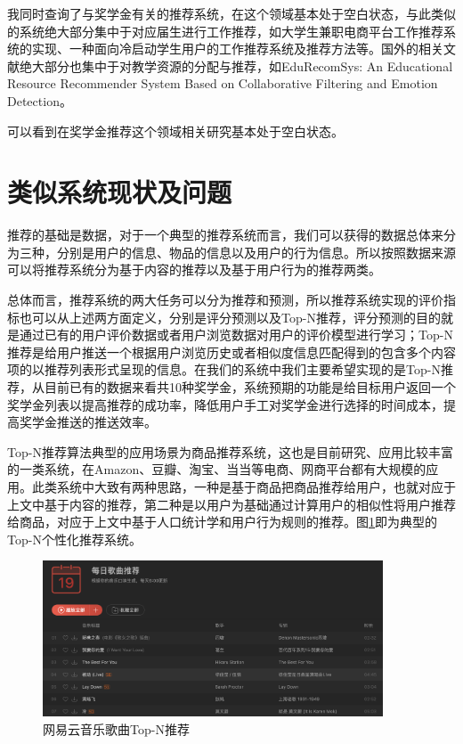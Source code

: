我同时查询了与奖学金有关的推荐系统，在这个领域基本处于空白状态，与此类似的系统绝大部分集中于对应届生进行工作推荐，如大学生兼职电商平台工作推荐系统的实现\cite{郭洁畅2017大学生兼职电商平台工作推荐系统的实现}、一种面向冷启动学生用户的工作推荐系统及推荐方法\cite{一种面向冷启动学生用户的工作推荐系统及推荐方法}等。国外的相关文献绝大部分也集中于对教学资源的分配与推荐，如EduRecomSys: An Educational Resource Recommender System Based on Collaborative Filtering and Emotion Detection\cite{bustos2020edurecomsys}。

可以看到在奖学金推荐这个领域相关研究基本处于空白状态。

\section{类似系统现状及问题}

推荐的基础是数据，对于一个典型的推荐系统而言，我们可以获得的数据总体来分为三种，分别是用户的信息、物品的信息以及用户的行为信息。所以按照数据来源可以将推荐系统分为基于内容的推荐以及基于用户行为的推荐两类。

总体而言，推荐系统的两大任务可以分为推荐和预测，所以推荐系统实现的评价指标也可以从上述两方面定义，分别是评分预测以及Top-N推荐，评分预测的目的就是通过已有的用户评价数据或者用户浏览数据对用户的评价模型进行学习；Top-N推荐是给用户推送一个根据用户浏览历史或者相似度信息匹配得到的包含多个内容项的以推荐列表形式呈现的信息。在我们的系统中我们主要希望实现的是Top-N推荐，从目前已有的数据来看共10种奖学金，系统预期的功能是给目标用户返回一个奖学金列表以提高推荐的成功率，降低用户手工对奖学金进行选择的时间成本，提高奖学金推送的推送效率。

Top-N推荐算法典型的应用场景为商品推荐系统，这也是目前研究、应用比较丰富的一类系统，在Amazon、豆瓣、淘宝、当当等电商、网商平台都有大规模的应用。此类系统中大致有两种思路，一种是基于商品把商品推荐给用户，也就对应于上文中基于内容的推荐，第二种是以用户为基础通过计算用户的相似性将用户推荐给商品，对应于上文中基于人口统计学和用户行为规则的推荐。图\ref{NetEase_Music}即为典型的Top-N个性化推荐系统。

\begin{figure}[htbp]
    \vspace{3pt} %
    \centering
    \includegraphics[width=0.9\textwidth]{images/NetEaseMusic.png}
    \caption{网易云音乐歌曲Top-N推荐}\label{NetEase_Music} %
  \end{figure}

